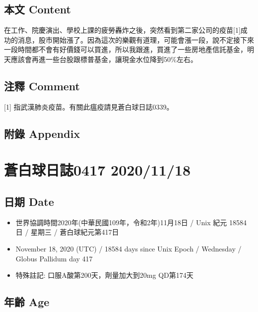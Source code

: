 \documentclass[
]{article}
\providecommand{\tightlist}{%
  \setlength{\itemsep}{0pt}\setlength{\parskip}{0pt}}
\begin{document}
\hypertarget{ux672cux6587-content-70}{%
\subsection{本文 Content}\label{ux672cux6587-content-70}}

在工作、院慶演出、學校上課的疲勞轟炸之後，突然看到第二家公司的疫苗{[}1{]}成功的消息，股市開始漲了。因為這次的樂觀有道理，可能會漲一段，說不定接下來一段時間都不會有好價錢可以買進，所以我跟進，買進了一些房地產信託基金，明天應該會再進一些台股跟標普基金，讓現金水位降到50\%左右。

\hypertarget{ux6ce8ux91cb-comment-70}{%
\subsection{注釋 Comment}\label{ux6ce8ux91cb-comment-70}}

{[}1{]} 指武漢肺炎疫苗。有關此瘟疫請見蒼白球日誌0339。

\hypertarget{ux9644ux9304-appendix-70}{%
\subsection{附錄 Appendix}\label{ux9644ux9304-appendix-70}}

\hypertarget{ux84bcux767dux7403ux65e5ux8a8c0417-20201118}{%
\section{蒼白球日誌0417
2020/11/18}\label{ux84bcux767dux7403ux65e5ux8a8c0417-20201118}}

\hypertarget{ux65e5ux671f-date-71}{%
\subsection{日期 Date}\label{ux65e5ux671f-date-71}}

\begin{itemize}
\tightlist
\item
  世界協調時間2020年(中華民國109年，令和2年)11月18日 / Unix 紀元 18584
  日 / 星期三 / 蒼白球紀元第417日
\item
  November 18, 2020 (UTC) / 18584 days since Unix Epoch / Wednesday /
  Globus Pallidum day 417
\item
  特殊註記: 口服A酸第200天，劑量加大到20mg QD第174天
\end{itemize}

\hypertarget{ux5e74ux9f61-age-71}{%
\subsection{年齡 Age}\label{ux5e74ux9f61-age-71}}
\end{document}
